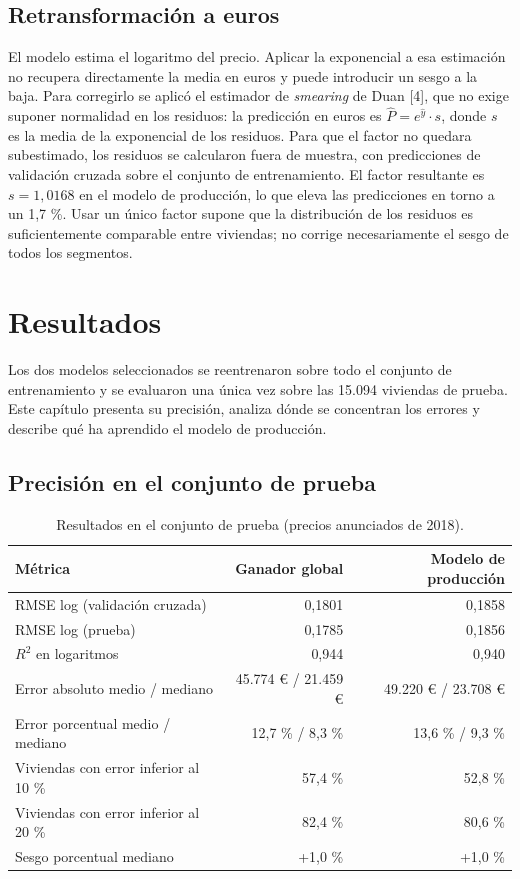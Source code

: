 \documentclass[11pt,a4paper]{article}
\newcommand{\thead}[1]{\textbf{#1}}
\begin{document}
\subsection{Retransformación a euros}

El modelo estima el logaritmo del precio. Aplicar la exponencial a esa estimación no recupera directamente la media en euros y puede introducir un sesgo a la baja. Para corregirlo se aplicó el estimador de \emph{smearing} de Duan [4], que no exige suponer normalidad en los residuos: la predicción en euros es $\hat{P} = e^{\hat{y}} \cdot s$, donde $s$ es la media de la exponencial de los residuos. Para que el factor no quedara subestimado, los residuos se calcularon fuera de muestra, con predicciones de validación cruzada sobre el conjunto de entrenamiento. El factor resultante es $s = 1{,}0168$ en el modelo de producción, lo que eleva las predicciones en torno a un 1,7 \%. Usar un único factor supone que la distribución de los residuos es suficientemente comparable entre viviendas; no corrige necesariamente el sesgo de todos los segmentos.

\section{Resultados}\label{sec:resultados}

Los dos modelos seleccionados se reentrenaron sobre todo el conjunto de entrenamiento y se evaluaron una única vez sobre las 15.094 viviendas de prueba. Este capítulo presenta su precisión, analiza dónde se concentran los errores y describe qué ha aprendido el modelo de producción.

\subsection{Precisión en el conjunto de prueba}

\begin{table}[!htb]
\centering
\caption{Resultados en el conjunto de prueba (precios anunciados de 2018).}
\label{tab:test}
\begin{tabularx}{\linewidth}{@{}L r r@{}}
\toprule
\thead{Métrica} & \thead{Ganador global} & \thead{Modelo de producción} \\
\midrule
RMSE log (validación cruzada) & 0,1801 & 0,1858 \\
RMSE log (prueba) & 0,1785 & 0,1856 \\
$R^2$ en logaritmos & 0,944 & 0,940 \\
Error absoluto medio / mediano & 45.774 € / 21.459 € & 49.220 € / 23.708 € \\
Error porcentual medio / mediano & 12,7 \% / 8,3 \% & 13,6 \% / 9,3 \% \\
Viviendas con error inferior al 10 \% & 57,4 \% & 52,8 \% \\
Viviendas con error inferior al 20 \% & 82,4 \% & 80,6 \% \\
Sesgo porcentual mediano & +1,0 \% & +1,0 \% \\
\bottomrule
\end{tabularx}
\end{table}
\end{document}
